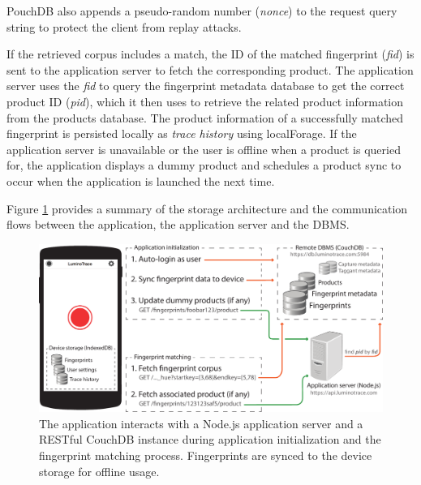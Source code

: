 \documentclass[thesis.tex]{subfiles}
\begin{document}
\noindent PouchDB also appends a pseudo-random number (\emph{nonce}) to the request query string to protect the client from replay attacks.

If the retrieved corpus includes a match, the ID of the matched fingerprint (\emph{fid}) is sent to the application server to fetch the corresponding product. The application server uses the \emph{fid} to query the fingerprint metadata database to get the correct product ID (\emph{pid}), which it then uses to retrieve the related product information from the products database. The product information of a successfully matched fingerprint is persisted locally as \emph{trace history} using localForage. If the application server is unavailable or the user is offline when a product is queried for, the application displays a dummy product and schedules a product sync to occur when the application is launched the next time.

Figure \ref{figure:application-database-flow} provides a summary of the storage architecture and the communication flows between the application, the application server and the DBMS.

\begin{figure}[h]
\centering \includegraphics[width=\textwidth,height=\textheight,keepaspectratio=true]{images/design_implementation/application_database_flow}
\caption{The application interacts with a Node.js application server and a RESTful CouchDB instance during application initialization and the fingerprint matching process. Fingerprints are synced to the device storage for offline usage.\label{figure:application-database-flow}}
\end{figure}
\end{document}
